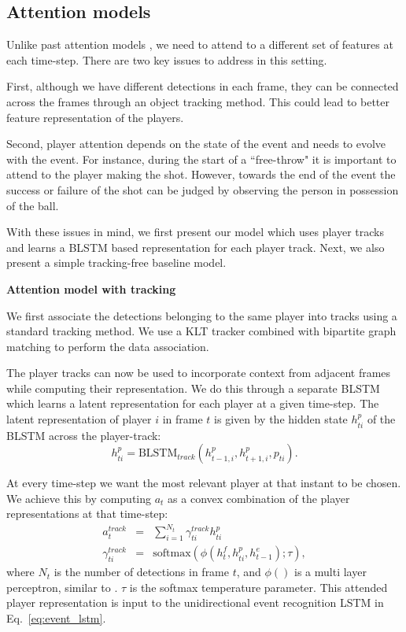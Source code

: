 \subsection{Attention models}
Unlike past attention models \cite{}, we need to attend to a different set of
features at each time-step. There are two key issues to address in this
setting.

First, although we have different detections in each frame, they
can be connected across the frames through an object tracking
method. This could lead to better feature representation of the
players.

Second, player attention depends on the state of the event and needs to evolve
with the event.  For instance, during the start of a ``free-throw" it is
important to attend to the player making the shot. However, towards the end of
the event the success or failure of the shot can be judged by observing the
person in possession of the ball.

With these issues in mind, we first present our model which uses player tracks
and learns a BLSTM based representation for each player track. Next, we also
present a simple tracking-free baseline model.

\noindent \textbf{Attention model with tracking}

We first associate the detections
belonging to the same player into tracks using a standard
tracking method. We use a KLT tracker combined with
bipartite graph matching \cite{} to perform the data association.

The player tracks can now be used to incorporate context
from adjacent frames while computing their representation.
We do this through a separate BLSTM which learns a latent
representation for each player at a given time-step.
The latent representation of player $i$ in frame $t$ is
given by the hidden state
$h_{ti}^p$ of the BLSTM across the player-track:
\[
  h_{ti}^p = \mbox{BLSTM}_{track}(h_{t-1,i}^p, h_{t+1,i}^p, p_{ti}).
\]

At every time-step we want the most relevant player at that
instant to be chosen. We achieve this by computing
$a_t$ as a convex combination of the player representations
at that time-step:
\begin{eqnarray} 
\label{eq:track}
  a_t^{track} & = & \sum_{i=1}^{N_t} \gamma_{ti}^{track} h_{ti}^p \\ \nonumber
  \gamma_{ti}^{track} & = & \text{softmax} \left(\phi\left(h^f_t, h^p_{ti}, h^e_{t-1}\right); \tau\right),
\end{eqnarray}where $N_t$ is the number of detections in frame $t$, and $\phi()$ is a 
multi layer perceptron, similar to \cite{Bahdnau_arxiv14}. $\tau$ is the softmax temperature parameter.
This attended player representation is input to the
unidirectional event recognition LSTM in Eq.~\ref{eq:event_lstm}.


